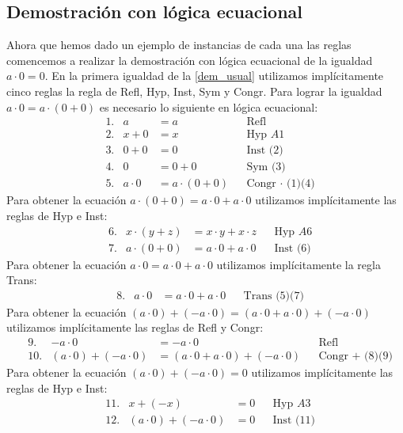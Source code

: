 \documentclass[a4paper]{article}
\begin{document}
\subsection{Demostración con lógica ecuacional}
\noindent
Ahora que hemos dado un ejemplo de instancias de cada una las reglas comencemos
a realizar la demostración con lógica ecuacional de la igualdad \(a \cdot 0 = 0\).
\newline 
En la primera igualdad de la \ref{dem_usual} utilizamos implícitamente cinco reglas
la regla de Refl, Hyp, Inst, Sym y Congr.
\newline 
Para lograr la igualdad \(a \cdot 0 = a \cdot (0 + 0)\) es necesario lo siguiente en lógica
ecuacional:
\begin{align*}
    &\text{1.} & a &= a & &\text{Refl} \\
    &\text{2.} & x + 0 &= x & &\text{Hyp }A1 \\
    &\text{3.} & 0 + 0 &= 0 & &\text{Inst (2)} \\
    &\text{4.} & 0 &= 0 + 0 & &\text{Sym (3)} \\
    &\text{5.} & a \cdot 0 &= a \cdot (0 + 0) & &\text{Congr \(\cdot\) (1)(4)}
\end{align*}
Para obtener la ecuación \(a \cdot (0 + 0) = a \cdot 0 + a \cdot 0\) utilizamos 
implícitamente las reglas de Hyp e Inst:
\begin{align*}
    &\text{6.} & x \cdot (y + z) &= x \cdot y + x \cdot z & &\text{Hyp } A6 \\
    &\text{7.} & a \cdot (0 + 0) &= a \cdot 0 + a \cdot 0 & &\text{Inst (6)}
\end{align*}
Para obtener la ecuación \(a \cdot 0 = a \cdot 0 + a \cdot 0\) utilizamos 
implícitamente la regla Trans:
\begin{align*}
    &\text{8.} & a \cdot 0 &= a \cdot 0 + a \cdot 0 & &\text{Trans (5)(7)}
\end{align*}
Para obtener la ecuación \((a \cdot 0) + (-a \cdot 0)  = (a \cdot 0 + a \cdot 0) + (-a \cdot 0)\)
utilizamos implícitamente las reglas de Refl y Congr:
\begin{align*}
    &\text{9.} & -a \cdot 0 &= -a \cdot 0 & &\text{Refl} \\
    &\text{10.} & (a \cdot 0) + (-a \cdot 0) &= (a \cdot 0 + a \cdot 0) + (-a \cdot 0) & &\text{Congr + (8)(9)}
\end{align*}
Para obtener la ecuación \((a \cdot 0) + (-a \cdot 0) = 0\) utilizamos implícitamente las reglas de 
Hyp e Inst:
\begin{align*}
    &\text{11.} & x + (-x) &= 0 & &\text{Hyp }A3 \\
    &\text{12.} & (a \cdot 0) + (-a \cdot 0) &= 0 & &\text{Inst (11)}
\end{align*}
\end{document}

